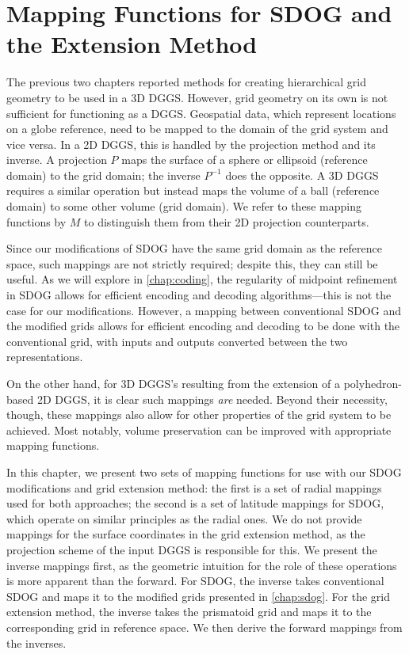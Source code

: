 \chapter{Mapping Functions for SDOG and the Extension Method} \label{chap:mapping}
The previous two chapters reported methods for creating hierarchical grid geometry to be used in a 3D DGGS.
However, grid geometry on its own is not sufficient for functioning as a DGGS.
Geospatial data, which represent locations on a globe reference, need to be mapped to the domain of the grid system and vice versa.
In a 2D DGGS, this is handled by the projection method and its inverse.
A projection $P$ maps the surface of a sphere or ellipsoid (reference domain) to the grid domain; the inverse $P^{-1}$ does the opposite.
A 3D DGGS requires a similar operation but instead maps the volume of a ball (reference domain) to some other volume (grid domain).
We refer to these mapping functions by $M$ to distinguish them from their 2D projection counterparts.


Since our modifications of SDOG have the same grid domain as the reference space, such mappings are not strictly required; despite this, they can still be useful.
As we will explore in \cref{chap:coding}, the regularity of midpoint refinement in SDOG allows for efficient encoding and decoding algorithms---this is not the case for our modifications.
However, a mapping between conventional SDOG and the modified grids allows for efficient encoding and decoding to be done with the conventional grid, with inputs and outputs converted between the two representations.


On the other hand, for 3D DGGS's resulting from the extension of a polyhedron-based 2D DGGS, it is clear such mappings \textit{are} needed.
Beyond their necessity, though, these mappings also allow for other properties of the grid system to be achieved. Most notably, volume preservation can be improved with appropriate mapping functions.


In this chapter, we present two sets of mapping functions for use with our SDOG modifications and grid extension method:
the first is a set of radial mappings used for both approaches;
the second is a set of latitude mappings for SDOG, which operate on similar principles as the radial ones.
We do not provide mappings for the surface coordinates in the grid extension method, as the projection scheme of the input DGGS is responsible for this.
We present the inverse mappings first, as the geometric intuition for the role of these operations is more apparent than the forward.
For SDOG, the inverse takes conventional SDOG and maps it to the modified grids presented in \cref{chap:sdog}.
For the grid extension method, the inverse takes the prismatoid grid and maps it to the corresponding grid in reference space.
We then derive the forward mappings from the inverses.


